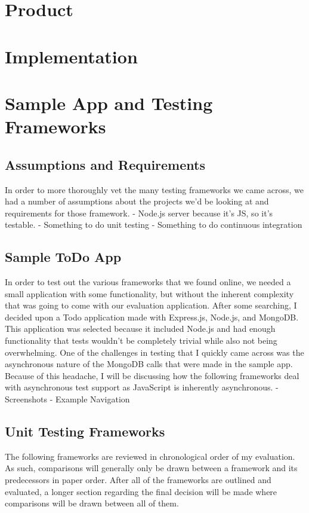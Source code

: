 \documentclass[11pt]{article}
\begin{document}
\section{Product}


\section{Implementation}


\section{Sample App and Testing Frameworks}

\subsection{Assumptions and Requirements}
In order to more thoroughly vet the many testing frameworks we came across, we had a number of assumptions about the projects we'd be looking at and requirements for those framework.
- Node.js server because it's JS, so it's testable.
- Something to do unit testing
- Something to do continuous integration

\subsection{Sample ToDo App}
In order to test out the various frameworks that we found online, we needed a small application with some functionality, but without the inherent complexity that was going to come with our evaluation application. After some searching, I decided upon a Todo application made with Express.js, Node.js, and MongoDB. \cite{ToDoAppHomePage} This application was selected because it included Node.js and had enough functionality that tests wouldn't be completely trivial while also not being overwhelming.
One of the challenges in testing that I quickly came across was the asynchronous nature of the MongoDB calls that were made in the sample app. Because of this headache, I will be discussing how the following frameworks deal with asynchronous test support as JavaScript is inherently asynchronous.
- Screenshots
- Example Navigation

\subsection{Unit Testing Frameworks}
The following frameworks are reviewed in chronological order of my evaluation. As such, comparisons will generally only be drawn between a framework and its predecessors in paper order. After all of the frameworks are outlined and evaluated, a longer section regarding the final decision will be made where comparisons will be drawn between all of them. 
\end{document}
